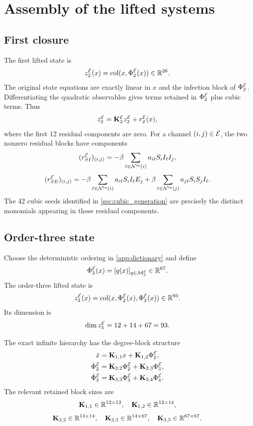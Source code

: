 \section{Assembly of the lifted systems}
\label{sec:lifted_system}

\subsection{First closure}

The first lifted state is
\[
z_2^{\mathcal{E}}(x)
=
\operatorname{col}(x,\Phi_2^{\mathcal{E}}(x))
\in\mathbb{R}^{26}.
\]
The original state equations are exactly linear in $x$ and the infection block
of $\Phi_2^{\mathcal{E}}$. Differentiating the quadratic observables gives terms
retained in $\Phi_2^{\mathcal{E}}$ plus cubic terms. Thus
\[
\dot z_2^{\mathcal{E}}
=
\mathbf{K}_2^{\mathcal{E}}z_2^{\mathcal{E}}
+r_2^{\mathcal{E}}(x),
\]
where the first 12 residual components are zero. For a channel
$(i,j)\in\mathcal{E}$, the two nonzero residual blocks have components
\[
(r_{SI}^{\mathcal{E}})_{(i,j)}
=
-\beta\sum_{\ell\in\mathcal{N}^{\mathrm{in}}(i)}
 a_{i\ell}S_iI_\ell I_j,
\]
\[
(r_{SE}^{\mathcal{E}})_{(i,j)}
=
-\beta\sum_{\ell\in\mathcal{N}^{\mathrm{in}}(i)}
 a_{i\ell}S_iI_\ell E_j
+
\beta\sum_{\ell\in\mathcal{N}^{\mathrm{in}}(j)}
 a_{j\ell}S_iS_jI_\ell.
\]
The 42 cubic seeds identified in \cref{sec:cubic_generation} are precisely the
distinct monomials appearing in these residual components.

\subsection{Order-three state}

Choose the deterministic ordering in \cref{app:dictionary} and define
\[
\Phi_3^{\mathcal{E}}(x)
=
[q(x)]_{q\in\mathcal M_3^{\mathcal{E}}}
\in\mathbb{R}^{67}.
\]
The order-three lifted state is
\[
z_3^{\mathcal{E}}(x)
=
\operatorname{col}(x,\Phi_2^{\mathcal{E}}(x),\Phi_3^{\mathcal{E}}(x))
\in\mathbb{R}^{93}.
\]
Its dimension is
\[
\dim z_3^{\mathcal{E}}
=12+14+67
=93.
\]

The exact infinite hierarchy has the degree-block structure
\[
\begin{aligned}
\dot x
&=\mathbf{K}_{1,1}x+\mathbf{K}_{1,2}\Phi_2^{\mathcal{E}},\\
\dot\Phi_2^{\mathcal{E}}
&=\mathbf{K}_{2,2}\Phi_2^{\mathcal{E}}
 +\mathbf{K}_{2,3}\Phi_3^{\mathcal{E}},\\
\dot\Phi_3^{\mathcal{E}}
&=\mathbf{K}_{3,3}\Phi_3^{\mathcal{E}}
 +\mathbf{K}_{3,4}\Phi_4^{\mathcal{E}}.
\end{aligned}
\]
The relevant retained block sizes are
\[
\mathbf{K}_{1,1}\in\mathbb{R}^{12\times12},
\quad
\mathbf{K}_{1,2}\in\mathbb{R}^{12\times14},
\]
\[
\mathbf{K}_{2,2}\in\mathbb{R}^{14\times14},
\quad
\mathbf{K}_{2,3}\in\mathbb{R}^{14\times67},
\quad
\mathbf{K}_{3,3}\in\mathbb{R}^{67\times67}.
\]

